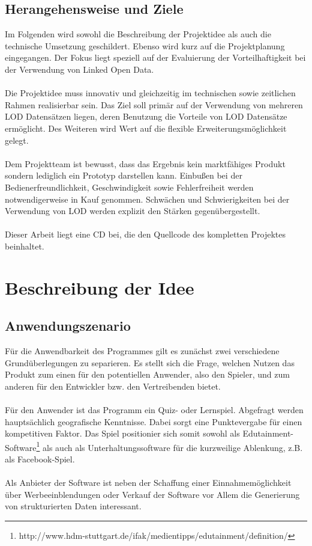 \documentclass[a4paper, 11pt]{article}
\begin{document}
\subsection{Herangehensweise und Ziele}
Im Folgenden wird sowohl die Beschreibung  der Projektidee als auch die technische Umsetzung geschildert. Ebenso wird kurz auf die Projektplanung eingegangen. Der Fokus liegt speziell auf der Evaluierung der Vorteilhaftigkeit bei der Verwendung von Linked Open Data. \\\\
Die Projektidee muss innovativ und gleichzeitig im technischen sowie zeitlichen Rahmen realisierbar sein. Das Ziel soll primär auf der Verwendung von mehreren LOD Datensätzen liegen, deren Benutzung die Vorteile von LOD Datensätze ermöglicht. Des Weiteren wird Wert auf die flexible Erweiterungsmöglichkeit gelegt. \\\\
Dem Projektteam ist bewusst, dass das Ergebnis kein marktfähiges Produkt sondern lediglich ein Prototyp darstellen kann. Einbußen bei der Bedienerfreundlichkeit, Geschwindigkeit sowie Fehlerfreiheit werden notwendigerweise in Kauf genommen. Schwächen und Schwierigkeiten bei der Verwendung von LOD werden explizit den Stärken gegenübergestellt.\\\\
Dieser Arbeit liegt eine CD bei, die den Quellcode des kompletten Projektes beinhaltet.
\newpage
\section{Beschreibung der Idee}
\subsection{Anwendungszenario}
Für die Anwendbarkeit des Programmes gilt es zunächst zwei verschiedene Grundüberlegungen zu separieren. Es stellt sich die Frage, welchen Nutzen das Produkt zum einen für den potentiellen Anwender, also den Spieler, und zum anderen für den Entwickler bzw. den Vertreibenden bietet.\\\\Für den Anwender ist das Programm ein Quiz- oder Lernspiel. Abgefragt werden hauptsächlich geografische Kenntnisse. Dabei sorgt eine Punktevergabe für einen kompetitiven Faktor. Das Spiel positionier sich somit sowohl als Edutainment-Software\footnote{http://www.hdm-stuttgart.de/ifak/medientipps/edutainment/definition/} als auch als Unterhaltungssoftware für die kurzweilige Ablenkung, z.B. als Facebook-Spiel.\\\\
Als Anbieter der Software ist neben der Schaffung einer Einnahmemöglichkeit über Werbeeinblendungen oder Verkauf der Software vor Allem die Generierung von strukturierten Daten interessant. 
\end{document}
